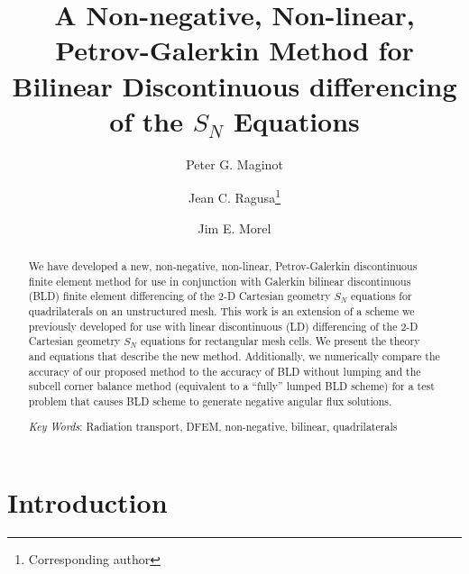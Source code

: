 \documentclass{mc2015}
\begin{document}
\title{A Non-negative, Non-linear, Petrov-Galerkin Method for Bilinear Discontinuous differencing of the $S_N$ Equations}

\author{Peter G. Maginot}
\author{Jean C. Ragusa\footnote{Corresponding author} }
\author{Jim E. Morel}

\maketitle

\begin{abstract}
We have developed a new, non-negative, non-linear, Petrov-Galerkin discontinuous finite element method for use in conjunction with Galerkin bilinear discontinuous  
(BLD) finite element differencing of the 2-D Cartesian geometry $S_N$ equations for quadrilaterals on an unstructured mesh.  
This work is an extension of a scheme we previously developed for use with linear discontinuous (LD) differencing of the 2-D Cartesian geometry $S_N$ equations for rectangular mesh cells.
We present the theory and equations that describe the new method.  
Additionally, we numerically compare the accuracy of our proposed method to the accuracy of BLD without lumping and the subcell corner balance method (equivalent to a ``fully'' lumped BLD scheme) for a test problem that causes BLD scheme to generate negative angular flux solutions.

\emph{Key Words}: Radiation transport, DFEM, non-negative, bilinear, quadrilaterals
\end{abstract}


\section{Introduction}

%
%
%
\end{document}
